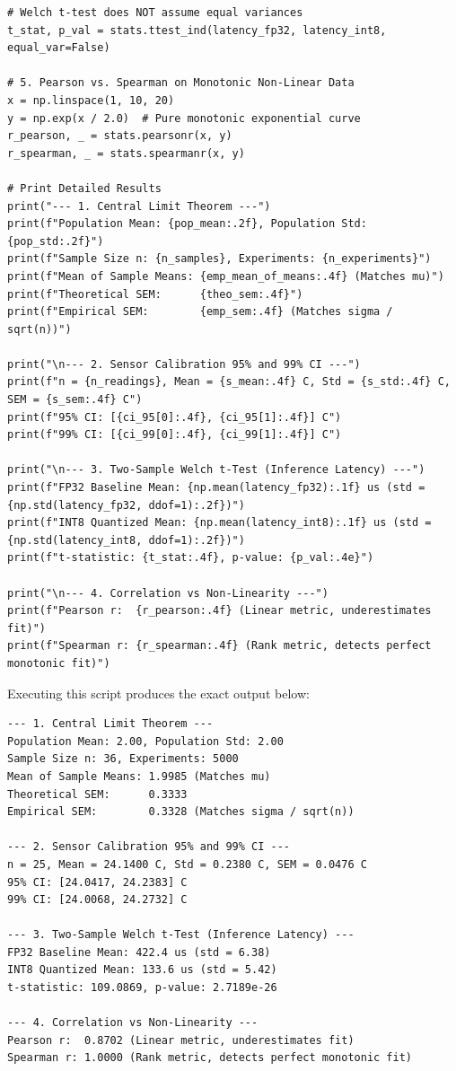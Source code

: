\begin{lstlisting}[style=pythonstyle]
# Welch t-test does NOT assume equal variances
t_stat, p_val = stats.ttest_ind(latency_fp32, latency_int8, equal_var=False)

# 5. Pearson vs. Spearman on Monotonic Non-Linear Data
x = np.linspace(1, 10, 20)
y = np.exp(x / 2.0)  # Pure monotonic exponential curve
r_pearson, _ = stats.pearsonr(x, y)
r_spearman, _ = stats.spearmanr(x, y)

# Print Detailed Results
print("--- 1. Central Limit Theorem ---")
print(f"Population Mean: {pop_mean:.2f}, Population Std: {pop_std:.2f}")
print(f"Sample Size n: {n_samples}, Experiments: {n_experiments}")
print(f"Mean of Sample Means: {emp_mean_of_means:.4f} (Matches mu)")
print(f"Theoretical SEM:      {theo_sem:.4f}")
print(f"Empirical SEM:        {emp_sem:.4f} (Matches sigma / sqrt(n))")

print("\n--- 2. Sensor Calibration 95% and 99% CI ---")
print(f"n = {n_readings}, Mean = {s_mean:.4f} C, Std = {s_std:.4f} C, SEM = {s_sem:.4f} C")
print(f"95% CI: [{ci_95[0]:.4f}, {ci_95[1]:.4f}] C")
print(f"99% CI: [{ci_99[0]:.4f}, {ci_99[1]:.4f}] C")

print("\n--- 3. Two-Sample Welch t-Test (Inference Latency) ---")
print(f"FP32 Baseline Mean: {np.mean(latency_fp32):.1f} us (std = {np.std(latency_fp32, ddof=1):.2f})")
print(f"INT8 Quantized Mean: {np.mean(latency_int8):.1f} us (std = {np.std(latency_int8, ddof=1):.2f})")
print(f"t-statistic: {t_stat:.4f}, p-value: {p_val:.4e}")

print("\n--- 4. Correlation vs Non-Linearity ---")
print(f"Pearson r:  {r_pearson:.4f} (Linear metric, underestimates fit)")
print(f"Spearman r: {r_spearman:.4f} (Rank metric, detects perfect monotonic fit)")
\end{lstlisting}

Executing this script produces the exact output below:
\begin{lstlisting}[style=outputstyle]
--- 1. Central Limit Theorem ---
Population Mean: 2.00, Population Std: 2.00
Sample Size n: 36, Experiments: 5000
Mean of Sample Means: 1.9985 (Matches mu)
Theoretical SEM:      0.3333
Empirical SEM:        0.3328 (Matches sigma / sqrt(n))

--- 2. Sensor Calibration 95% and 99% CI ---
n = 25, Mean = 24.1400 C, Std = 0.2380 C, SEM = 0.0476 C
95% CI: [24.0417, 24.2383] C
99% CI: [24.0068, 24.2732] C

--- 3. Two-Sample Welch t-Test (Inference Latency) ---
FP32 Baseline Mean: 422.4 us (std = 6.38)
INT8 Quantized Mean: 133.6 us (std = 5.42)
t-statistic: 109.0869, p-value: 2.7189e-26

--- 4. Correlation vs Non-Linearity ---
Pearson r:  0.8702 (Linear metric, underestimates fit)
Spearman r: 1.0000 (Rank metric, detects perfect monotonic fit)
\end{lstlisting}

